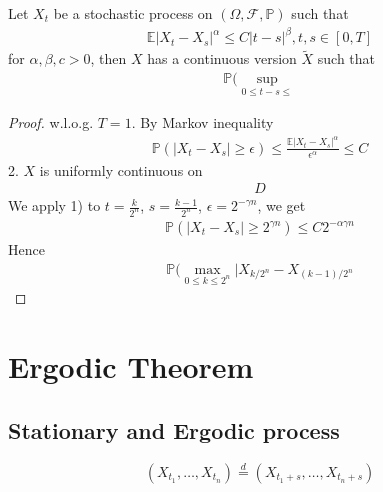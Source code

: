 \begin{theorem}
	Let $X_t$ be a stochastic process on $(\Omega, \mathcal{F}, \mathbb{P})$ such that 
	\begin{align*}
		\mathbb{E}|X_t - X_s|^\alpha \le C |t - s|^\beta, t, s \in [0, T]
	\end{align*}
	for $\alpha, \beta, c >0$, then $X$ has a continuous version $\tilde{X}$ such that
	\begin{align*}
		\mathbb{P}(\sup_{0 \le t- s \le} 
	\end{align*}
\end{theorem}
\begin{proof}
	w.l.o.g. $T = 1$. By Markov inequality
	\begin{align*}
		\mathbb{P}(|X_t - X_s| \geq \epsilon ) \le \frac{\mathbb{E}|X_t - X_s|^\alpha}{\epsilon^\alpha} \le C 
	\end{align*}
	2. $X$ is uniformly continuous on 
	\begin{align*}
		D
	\end{align*}
	We apply 1) to $t = \frac{k}{2^n}$, $s = \frac{k-1}{2^n}$, $\epsilon = 2^{-\gamma n}$, we get
	\begin{align*}
		\mathbb{P}(|X_t - X_s| \ge 2^{\gamma n}) \le C 2^{- \alpha\gamma n}
	\end{align*}
	Hence 
	\begin{align*}
		\mathbb{P}(\max_{0 \le k \le 2^n} | X_{k \slash 2^n} - X_{(k-1)\slash 2^n}
	\end{align*}
\end{proof}






 
 

 
 
 \newpage
 \section{Ergodic Theorem}
 \subsection{Stationary and Ergodic process}
 \begin{definition}
 \begin{equation*}
 	(X_{t_1}, \dots, X_{t_n}) \overset{d}{=} (X_{t_1 + s}, \dots, X_{t_n + s})
 \end{equation*}
 \end{definition}
 
